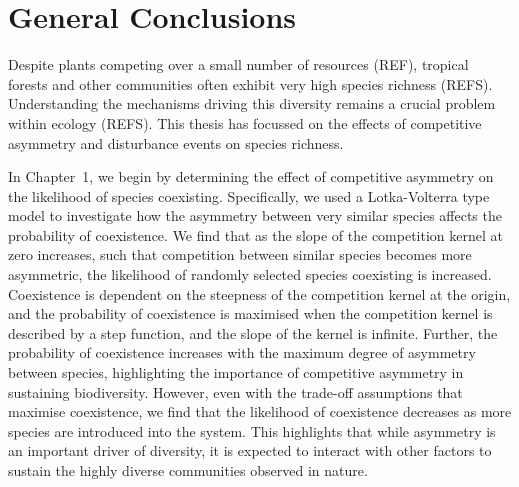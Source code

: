 \documentclass[preprint,10pt,reqno]{amsart}
\begin{document}
\section*{General Conclusions}
Despite plants competing over a small number of resources (REF), tropical forests and other communities often exhibit very high species richness (REFS). Understanding the mechanisms driving this diversity remains a crucial problem within ecology (REFS). This thesis has focussed on the effects of competitive asymmetry and disturbance events on species richness.

In Chapter~1, we begin by determining the effect of competitive asymmetry on the likelihood of species coexisting. Specifically, we used a Lotka-Volterra type model to investigate how the asymmetry between very similar species affects the probability of coexistence. We find that as the slope of the competition kernel at zero increases, such that competition between similar species becomes more asymmetric, the likelihood of randomly selected species coexisting is increased. Coexistence is dependent on the steepness of the competition kernel at the origin, and the probability of coexistence is maximised when the competition kernel is described by a step function, and the slope of the kernel is infinite. Further, the probability of coexistence increases with the maximum degree of asymmetry between species, highlighting the importance of competitive asymmetry in sustaining biodiversity. However, even with the trade-off assumptions that maximise coexistence, we find that the likelihood of coexistence decreases as more species are introduced into the system. This highlights that while asymmetry is an important driver of diversity, it is expected to interact with other factors to sustain the highly diverse communities observed in nature.
\end{document}
